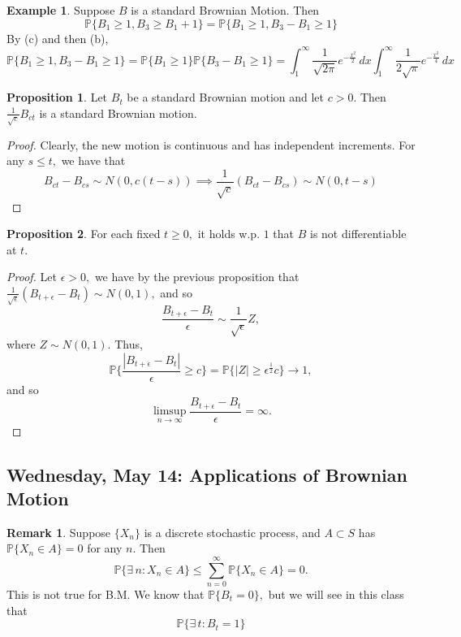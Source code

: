 \documentclass[10pt, oneside]{article}
\newcommand{\bbP}{\mathbb{P}}
\theoremstyle{definition}
\newtheorem{exmp}{Example}[section]
\newtheorem{prop}{Proposition}
\newtheorem{rem}{Remark}
\begin{document}
\begin{exmp}
    Suppose $B$ is a standard Brownian Motion. Then 
    \[\bbP\{B_1 \geq 1, B_3 \geq B_1 + 1\} = \bbP\{B_1 \geq 1, B_3 - B_1 \geq 1\}\] By (c) and then (b), 
    \[\bbP\{B_1 \geq 1, B_3 - B_1 \geq 1\} = \bbP\{B_1 \geq 1\} \bbP\{B_3 - B_1 \geq 1\} = \int_1^\infty \frac{1}{\sqrt{2\pi}}e^{-\frac{x^2}{2}}\, dx\int_1^\infty \frac{1}{2\sqrt{\pi }}e^{-\frac{x^2}{4}}\,dx\]
\end{exmp}
\begin{prop}
    Let $B_t$ be a standard Brownian motion and let $c >0.$ Then $\frac{1}{\sqrt{c}}B_{ct}$ is a standard Brownian motion. 
    \end{prop}
    \begin{proof}
    Clearly, the new motion is continuous and has independent increments. For any $s\leq t,$ we have that 
    \[B_{ct} - B_{cs} \sim N(0, c(t-s)) \implies \frac{1}{\sqrt{c}}(B_{ct} - B_{cs})\sim N(0,t-s)\]
\end{proof}
\begin{prop}
    For each fixed $t\geq 0,$ it holds w.p. $1$ that $B$ is not differentiable at $t.$
\end{prop}
\begin{proof}
    Let $\epsilon>0,$ we have by the previous proposition that $\frac{1}{\sqrt{\epsilon}}(B_{t + \epsilon } - B_t)\sim N(0,1),$ and so 
    \[\frac{B_{t + \epsilon} - B_t}{\epsilon} \sim \frac{1}{\sqrt{\epsilon}} Z,\] where $Z\sim N(0,1).$ Thus, 
    \[\bbP\{\frac{|B_{t + \epsilon} - B_t|}{\epsilon} \geq c\} = \bbP\{|Z| \geq \epsilon^\frac{1}{2}c\} \to 1,\] and so 
    \[\limsup_{n\to \infty}\frac{B_{t + \epsilon} - B_t}{\epsilon} = \infty.\]
\end{proof}

\newpage
\subsection{Wednesday, May 14: Applications of Brownian Motion}
\begin{rem}
    Suppose $\{X_n\}$ is a discrete stochastic process, and $A\subset S$ has $\bbP\{X_n \in A\}= 0$ for any $n.$ Then 
    \[\bbP\{\exists \, n : X_n \in A\} \leq \sum_{n=0}^\infty \bbP\{X_n \in A\} = 0.\] This is not true for B.M. We know that $\bbP\{B_t = 0\},$ but we will see in this class that 
    \[\bbP\{\exists \, t : B_t = 1\}\]
\end{rem}
\end{document}
